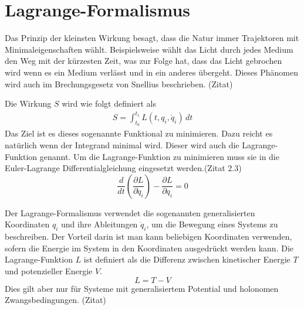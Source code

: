 \section{Lagrange-Formalismus}
Das Prinzip der kleinsten Wirkung besagt, dass die Natur immer Trajektoren mit Minimaleigenschaften wählt.
Beispielsweise wählt das Licht durch jedes Medium den Weg mit der kürzesten Zeit, was zur Folge hat,
dass das Licht gebrochen wird wenn es ein Medium verlässt und in ein anderes übergeht.
Dieses Phänomen wird auch im Brechungsgesetz von Snellius beschrieben. (Zitat)

Die Wirkung \(S\) wird wie folgt definiert als
\begin{align}
    S = \int_{t_0}^{t_1} L(t,q_i,\dot{q}_i) \,dt 
\end{align}
Das Ziel ist es dieses sogenannte Funktional zu minimieren.
Dazu reicht es natürlich wenn der Integrand minimal wird.
Dieser wird auch die Lagrange-Funktion genannt.
Um die Lagrange-Funktion zu minimieren muss sie in die Euler-Lagrange Differentialgleichung eingesetzt werden.(Zitat 2.3)
\begin{equation}
    \frac{d}{dt} \left( \frac{\partial L}{\partial \dot{q}_i} \right) 
    - \frac{\partial L}{\partial q_i} = 0
\end{equation}

Der Lagrange-Formalismus verwendet die sogenannten generalisierten 
Koordinaten \(q_i\) und ihre Ableitungen \(\dot{q}_i\), um die Bewegung eines Systems zu beschreiben.
Der Vorteil darin ist man kann beliebigen Koordinaten verwenden, sofern die Energie im System in 
den Koordinaten ausgedrückt werden kann.
Die Lagrange-Funktion \(L\) ist definiert als die Differenz zwischen 
kinetischer Energie \(T\) und potenzieller Energie \(V\).
\begin{equation}
    L = T - V
    \label{eq:lagrange} 
\end{equation}
Dies gilt aber nur für Systeme mit generalisiertem Potential und holonomen Zwangsbedingungen. (Zitat)


